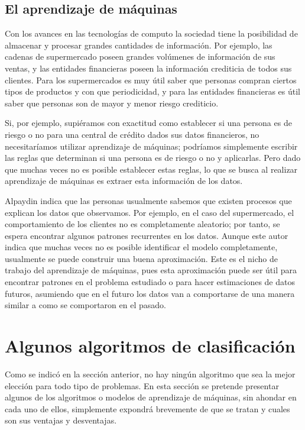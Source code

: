 \documentclass[a4paper, 11pt, oneside]{report}
\begin{document}
\subsection{El aprendizaje de máquinas}
\label{sect:machineLearning}

Con los avances en las tecnologías de computo la sociedad tiene la posibilidad de almacenar y procesar grandes cantidades de información. Por ejemplo, las cadenas de supermercado poseen grandes volúmenes de información de sus ventas, y las entidades financieras poseen la información crediticia de todos sus clientes. Para los supermercados es muy útil saber que personas compran ciertos tipos de productos y con que periodicidad, y para las entidades financieras es útil saber que personas son de mayor y menor riesgo crediticio.

Si, por ejemplo, supiéramos con exactitud como establecer si una persona es de riesgo o no para una central de crédito dados sus datos financieros, no necesitaríamos utilizar
aprendizaje de máquinas; podríamos simplemente escribir las reglas que determinan si una persona es de riesgo o no y aplicarlas. Pero dado que muchas veces no es posible establecer estas reglas, lo que se busca al realizar aprendizaje de máquinas es extraer esta información de los datos.

Alpaydin indica que las personas usualmente sabemos que existen procesos que explican los datos que observamos. Por ejemplo, en el caso del supermercado, el comportamiento de los clientes no es completamente aleatorio; por tanto, se espera encontrar algunos patrones recurrentes en los datos. Aunque este autor indica que muchas veces no es posible identificar el modelo completamente, usualmente se puede construir una buena aproximación. Este es el nicho de trabajo del aprendizaje de máquinas, pues esta aproximación puede ser útil para encontrar patrones en el problema estudiado o para hacer estimaciones de datos futuros, asumiendo que en el futuro los datos van a comportarse de una manera similar a como se comportaron en el pasado.


\section{Algunos algoritmos de clasificación}

Como se indicó en la sección anterior, no hay ningún algoritmo que sea la mejor elección para todo tipo de problemas. En esta sección se pretende presentar algunos de los algoritmos o modelos de aprendizaje de máquinas, sin ahondar en cada uno de ellos, simplemente expondrá brevemente de que se tratan y cuales son sus ventajas y desventajas.
\end{document}
